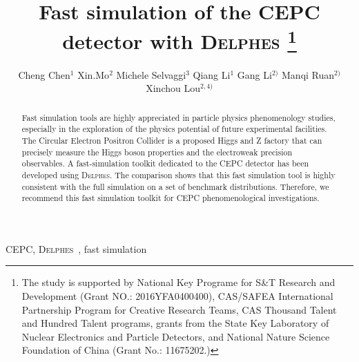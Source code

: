 \documentclass[a4paper,10pt,twoside]{cpc-hepnp}
\begin{document}



\title{Fast simulation of the CEPC detector with {\textsc{Delphes}}
\thanks{The study is supported by National Key Programe for S\&T Research and Development (Grant NO.: 2016YFA0400400), CAS/SAFEA International Partnership Program for Creative Research Teams, CAS Thousand Talent and Hundred Talent programs, grants from the State Key Laboratory of Nuclear Electronics and Particle Detectors, and National Nature Science Foundation of China (Grant No.: 11675202.)}}

\author{%
Cheng Chen$^{1}$
\quad Xin.Mo$^{2}$
\quad Michele Selvaggi$^{3}$
\quad Qiang Li$^{1}$
\quad Gang Li$^{2)}$%
\quad Manqi Ruan$^{2)}$%
\quad Xinchou Lou$^{2,4)}$%
}
\maketitle


\address{%
$^1$ Institute of High Energy Physics (IHEP), Chinese Academy of Sciences, Beijing 100049, China\\
$^3$ European Organization for Nuclear Research (CERN), Switzerland \\
$^2$ Peking University, Beijing, China\\ 
$^3$ University of Texas at Dallas, Richardson, TX 75080-3021, USA
}


\begin{abstract}
Fast simulation tools are highly appreciated in particle physics phenomenology studies, especially in the exploration of the physics potential of future experimental facilities. 
The Circular Electron Positron Collider is a proposed Higgs and Z factory that can precisely measure the Higgs boson properties and the electroweak precision observables. 
A fast-simulation toolkit dedicated to the CEPC detector has been developed using {\textsc{Delphes}}.
The comparison shows that this fast simulation tool is highly consistent with the full simulation on a set of benchmark distributions.  
Therefore, we recommend this fast simulation toolkit for CEPC phenomenological investigations. 
\end{abstract}


\begin{keyword}
CEPC, {\textsc{Delphes}~}, fast simulation
\end{keyword}
\end{document}
